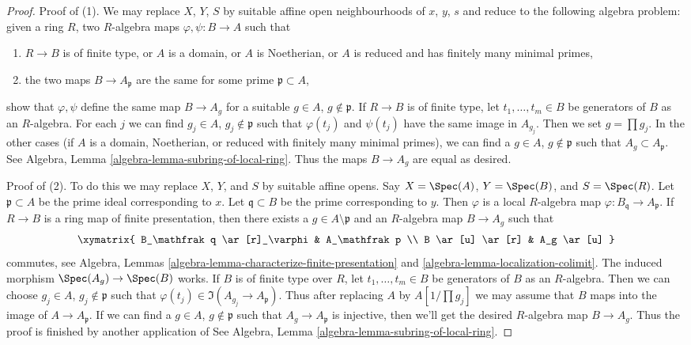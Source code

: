 \begin{proof}
Proof of (1). We may replace $X$, $Y$, $S$ by suitable affine open
neighbourhoods of $x$, $y$, $s$ and reduce to the following algebra
problem: given a ring $R$, two $R$-algebra maps $\varphi, \psi : B \to A$
such that
\begin{enumerate}
\item $R \to B$ is of finite type, or $A$ is a domain, or $A$
is Noetherian, or $A$ is reduced and has finitely many minimal primes,
\item the two maps $B \to A_\mathfrak p$ are the same for
some prime $\mathfrak p \subset A$,
\end{enumerate}
show that $\varphi, \psi$ define the same map $B \to A_g$ for
a suitable $g \in A$, $g \not \in \mathfrak p$. If $R \to B$ is of
finite type, let $t_1, \ldots, t_m \in B$ be generators of $B$
as an $R$-algebra. For each $j$ we can find
$g_j \in A$, $g_j \not \in \mathfrak p$
such that $\varphi(t_j)$ and $\psi(t_j)$ have the same image in
$A_{g_j}$. Then we set $g = \prod g_j$.
In the other cases (if $A$ is a domain, Noetherian, or reduced
with finitely many minimal primes), we can find a $g \in A$,
$g \not \in \mathfrak p$ such that $A_g \subset A_\mathfrak p$.
See Algebra, Lemma \ref{algebra-lemma-subring-of-local-ring}.
Thus the maps $B \to A_g$ are equal as desired.

\medskip\noindent
Proof of (2). To do this we may replace $X$, $Y$, and $S$ by suitable affine
opens. Say $X = \Spec(A)$, $Y = \Spec(B)$, and $S = \Spec(R)$.
Let $\mathfrak p \subset A$ be the prime ideal corresponding to $x$.
Let $\mathfrak q \subset B$ be the prime corresponding to $y$.
Then $\varphi$ is a local $R$-algebra map
$\varphi : B_\mathfrak q \to A_\mathfrak p$.
If $R \to B$ is a ring map of finite presentation, then there exists a
$g \in A \setminus \mathfrak p$ and an $R$-algebra map $B \to A_g$ such that
$$
\xymatrix{
B_\mathfrak q \ar[r]_\varphi & A_\mathfrak p \\
B \ar[u] \ar[r] & A_g \ar[u]
}
$$
commutes, see
Algebra, Lemmas \ref{algebra-lemma-characterize-finite-presentation} and
\ref{algebra-lemma-localization-colimit}.
The induced morphism $\Spec(A_g) \to \Spec(B)$ works.
If $B$ is of finite type over $R$, let $t_1, \ldots, t_m \in B$ be
generators of $B$ as an $R$-algebra. Then we can choose
$g_j \in A$, $g_j \not \in \mathfrak p$
such that $\varphi(t_j) \in \Im(A_{g_j} \to A_\mathfrak p)$.
Thus after replacing $A$ by $A[1/\prod g_j]$ we may assume
that $B$ maps into the image of $A \to A_\mathfrak p$.
If we can find a $g \in A$, $g \not \in \mathfrak p$
such that $A_g \to A_\mathfrak p$ is injective, then
we'll get the desired $R$-algebra map $B \to A_g$.
Thus the proof is finished by another application of
See Algebra, Lemma \ref{algebra-lemma-subring-of-local-ring}.
\end{proof}

